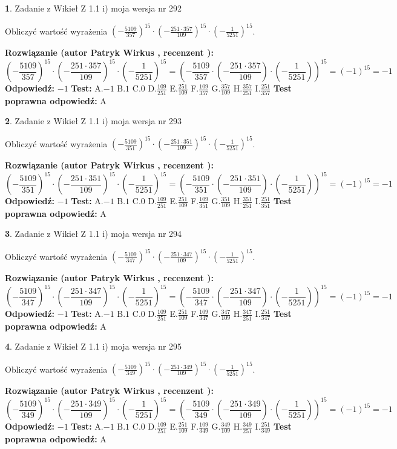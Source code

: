 \documentclass[12pt, a4paper]{article}
\theoremstyle{definition} %
\newtheorem{zad}{}
\newcommand{\zadStart}[1]{\begin{zad}#1\newline}
\newcommand{\zadStop}{\end{zad}}
\newcommand{\rozwStart}[2]{\noindent \textbf{Rozwiązanie (autor #1 , recenzent #2): }\newline}
\newcommand{\rozwStop}{\newline}
\newcommand{\odpStart}{\noindent \textbf{Odpowiedź:}\newline}
\newcommand{\odpStop}{\newline}
\newcommand{\testStart}{\noindent \textbf{Test:}\newline}
\newcommand{\testStop}{\newline}
\newcommand{\kluczStart}{\noindent \textbf{Test poprawna odpowiedź:}\newline}
\newcommand{\kluczStop}{\newline}
\begin{document}
\zadStart{Zadanie z Wikieł Z 1.1 i) moja wersja nr 292}

Obliczyć wartość wyrażenia $(-\frac{5109}{357})^{15} \cdot (-\frac{251 \cdot 357}{109})^{15} \cdot (-\frac{1}{5251})^{15}$.
\zadStop
\rozwStart{Patryk Wirkus}{}
$$(-\frac{5109}{357})^{15} \cdot (-\frac{251 \cdot 357}{109})^{15} \cdot (-\frac{1}{5251})^{15} = (-\frac{5109}{357} \cdot (-\frac{251 \cdot 357}{109}) \cdot (-\frac{1}{5251}))^{15} = (-1)^{15} = -1$$
\rozwStop
\odpStart
$-1$
\odpStop
\testStart
A.$-1$ B.$1$ C.$0$ D.$\frac{109}{251}$ E.$\frac{251}{109}$
F.$\frac{109}{357}$ G.$\frac{357}{109}$
H.$\frac{357}{251}$
I.$\frac{251}{357}$
\testStop
\kluczStart
A
\kluczStop



\zadStart{Zadanie z Wikieł Z 1.1 i) moja wersja nr 293}

Obliczyć wartość wyrażenia $(-\frac{5109}{351})^{15} \cdot (-\frac{251 \cdot 351}{109})^{15} \cdot (-\frac{1}{5251})^{15}$.
\zadStop
\rozwStart{Patryk Wirkus}{}
$$(-\frac{5109}{351})^{15} \cdot (-\frac{251 \cdot 351}{109})^{15} \cdot (-\frac{1}{5251})^{15} = (-\frac{5109}{351} \cdot (-\frac{251 \cdot 351}{109}) \cdot (-\frac{1}{5251}))^{15} = (-1)^{15} = -1$$
\rozwStop
\odpStart
$-1$
\odpStop
\testStart
A.$-1$ B.$1$ C.$0$ D.$\frac{109}{251}$ E.$\frac{251}{109}$
F.$\frac{109}{351}$ G.$\frac{351}{109}$
H.$\frac{351}{251}$
I.$\frac{251}{351}$
\testStop
\kluczStart
A
\kluczStop



\zadStart{Zadanie z Wikieł Z 1.1 i) moja wersja nr 294}

Obliczyć wartość wyrażenia $(-\frac{5109}{347})^{15} \cdot (-\frac{251 \cdot 347}{109})^{15} \cdot (-\frac{1}{5251})^{15}$.
\zadStop
\rozwStart{Patryk Wirkus}{}
$$(-\frac{5109}{347})^{15} \cdot (-\frac{251 \cdot 347}{109})^{15} \cdot (-\frac{1}{5251})^{15} = (-\frac{5109}{347} \cdot (-\frac{251 \cdot 347}{109}) \cdot (-\frac{1}{5251}))^{15} = (-1)^{15} = -1$$
\rozwStop
\odpStart
$-1$
\odpStop
\testStart
A.$-1$ B.$1$ C.$0$ D.$\frac{109}{251}$ E.$\frac{251}{109}$
F.$\frac{109}{347}$ G.$\frac{347}{109}$
H.$\frac{347}{251}$
I.$\frac{251}{347}$
\testStop
\kluczStart
A
\kluczStop



\zadStart{Zadanie z Wikieł Z 1.1 i) moja wersja nr 295}

Obliczyć wartość wyrażenia $(-\frac{5109}{349})^{15} \cdot (-\frac{251 \cdot 349}{109})^{15} \cdot (-\frac{1}{5251})^{15}$.
\zadStop
\rozwStart{Patryk Wirkus}{}
$$(-\frac{5109}{349})^{15} \cdot (-\frac{251 \cdot 349}{109})^{15} \cdot (-\frac{1}{5251})^{15} = (-\frac{5109}{349} \cdot (-\frac{251 \cdot 349}{109}) \cdot (-\frac{1}{5251}))^{15} = (-1)^{15} = -1$$
\rozwStop
\odpStart
$-1$
\odpStop
\testStart
A.$-1$ B.$1$ C.$0$ D.$\frac{109}{251}$ E.$\frac{251}{109}$
F.$\frac{109}{349}$ G.$\frac{349}{109}$
H.$\frac{349}{251}$
I.$\frac{251}{349}$
\testStop
\kluczStart
A
\kluczStop
\end{document}
